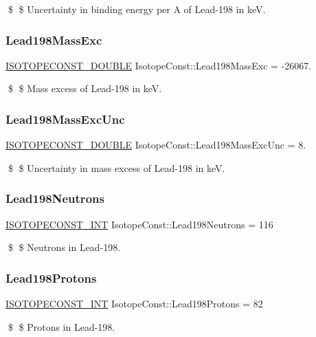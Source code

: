 \$ \$ Uncertainty in binding energy per A of Lead-\/198 in keV. \mbox{\label{group___isotope_const-_lead-_pb198_gad629c7936866600efcfb76e1f66c5a30}} 
\subsubsection{\texorpdfstring{Lead198\+Mass\+Exc}{Lead198MassExc}}
{\footnotesize\ttfamily \mbox{\hyperlink{group___isotope_const-_macros_ga8f45a7272ce02c0b4c65c44636ed719a}{I\+S\+O\+T\+O\+P\+E\+C\+O\+N\+S\+T\+\_\+\+D\+O\+U\+B\+LE}} Isotope\+Const\+::\+Lead198\+Mass\+Exc = -\/26067.}

\$ \$ Mass excess of Lead-\/198 in keV. \mbox{\label{group___isotope_const-_lead-_pb198_gad3b371dd355e170b538c1ffffdae50a7}} 
\subsubsection{\texorpdfstring{Lead198\+Mass\+Exc\+Unc}{Lead198MassExcUnc}}
{\footnotesize\ttfamily \mbox{\hyperlink{group___isotope_const-_macros_ga8f45a7272ce02c0b4c65c44636ed719a}{I\+S\+O\+T\+O\+P\+E\+C\+O\+N\+S\+T\+\_\+\+D\+O\+U\+B\+LE}} Isotope\+Const\+::\+Lead198\+Mass\+Exc\+Unc = 8.}

\$ \$ Uncertainty in mass excess of Lead-\/198 in keV. \mbox{\label{group___isotope_const-_lead-_pb198_ga0ded8f6f1c1c4c4d660e18f74bad6230}} 
\subsubsection{\texorpdfstring{Lead198\+Neutrons}{Lead198Neutrons}}
{\footnotesize\ttfamily \mbox{\hyperlink{group___isotope_const-_macros_ga5f18360b3e99483a35c32d789e62621c}{I\+S\+O\+T\+O\+P\+E\+C\+O\+N\+S\+T\+\_\+\+I\+NT}} Isotope\+Const\+::\+Lead198\+Neutrons = 116}

\$ \$ Neutrons in Lead-\/198. \mbox{\label{group___isotope_const-_lead-_pb198_gaef8ad3552057ac9f3f1d5811d7fb1d25}} 
\subsubsection{\texorpdfstring{Lead198\+Protons}{Lead198Protons}}
{\footnotesize\ttfamily \mbox{\hyperlink{group___isotope_const-_macros_ga5f18360b3e99483a35c32d789e62621c}{I\+S\+O\+T\+O\+P\+E\+C\+O\+N\+S\+T\+\_\+\+I\+NT}} Isotope\+Const\+::\+Lead198\+Protons = 82}

\$ \$ Protons in Lead-\/198. 